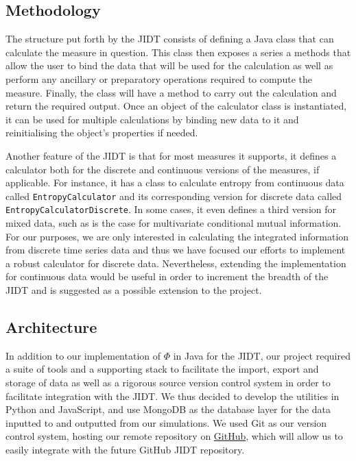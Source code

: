 \documentclass[a4paper,11pt]{article}
\begin{document}
\subsection{Methodology}

The structure put forth by the JIDT consists of defining a Java class that can calculate the measure in question. This class then exposes a series a methods that allow the user to bind the data that will be used for the calculation as well as perform any ancillary or preparatory operations required to compute the measure. Finally, the class will have a method to carry out the calculation and return the required output. Once an object of the calculator class is instantiated, it can be used for multiple calculations by binding new data to it and reinitialising the object's properties if needed. 

Another feature of the JIDT is that for most measures it supports, it defines a calculator both for the discrete and continuous versions of the measures, if applicable. For instance, it has a class to calculate entropy from continuous data called \texttt{EntropyCalculator} and its corresponding version for discrete data called \texttt{EntropyCalculatorDiscrete}. In some cases, it even defines a third version for mixed data, such as is the case for multivariate conditional mutual information. For our purposes, we are only interested in calculating the integrated information from discrete time series data and thus we have focused our efforts to implement a robust calculator for discrete data. Nevertheless, extending the implementation for continuous data would be useful in order to increment the breadth of the JIDT and is suggested as a possible extension to the project.

\subsection{Architecture}

In addition to our implementation of $\Phi$ in Java for the JIDT, our project required a suite of tools and a supporting stack to facilitate the import, export and storage of data as well as a rigorous source version control system in order to facilitate integration with the JIDT. We thus decided to develop the utilities in Python and JavaScript, and use MongoDB as the database layer for the data inputted to and outputted from our simulations. We used Git as our version control system, hosting our remote repository on \href{http://github.com}{GitHub}, which will allow us to easily integrate with the future GitHub JIDT repository.
\end{document}
